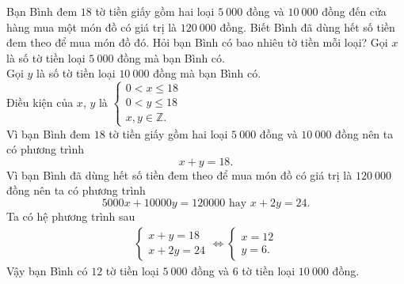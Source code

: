 \begin{ex}%
 Bạn Bình đem $18$ tờ tiền giấy gồm hai loại $5\ 000$ đồng và $10\ 000$ đồng đến cửa hàng mua một món đồ có giá trị là $120\ 000$ đồng. Biết Bình đã dùng hết số tiền đem theo để mua món đồ đó. Hỏi bạn Bình có bao nhiêu tờ tiền mỗi loại?
 \loigiai
  {
  Gọi $x$ là số tờ tiền loại $5\ 000$ đồng mà bạn Bình có.\\
  Gọi $y$ là số tờ tiền loại $10\ 000$ đồng mà bạn Bình có.\\
  Điều kiện của $x$, $y$ là $\begin{cases}  0 < x \leq 18 \\ 0 < y \leq 18 \\ x, y \in \mathbb{Z}. \end{cases}$\\
  Vì bạn Bình đem $18$ tờ tiền giấy gồm hai loại $5\ 000$ đồng và $10\ 000$ đồng nên ta có phương trình
  $$ x + y = 18.$$
  Vì bạn Bình đã dùng hết số tiền đem theo để mua món đồ có giá trị là $120\ 000$ đồng nên ta có phương trình
  $$5000x + 10000y = 120000 \text{ hay } x + 2y = 24.$$
  Ta có hệ phương trình sau
  \begin{align*}
  \begin{cases}
   x + y = 18 \\ x + 2y = 24
  \end{cases}
  \Leftrightarrow
  \begin{cases}
   x = 12 \\ y = 6.
  \end{cases}
  \end{align*}
  Vậy bạn Bình có $12$ tờ tiền loại $5\ 000$ đồng và $6$ tờ tiền loại $10\ 000$ đồng.
  }
\end{ex}


